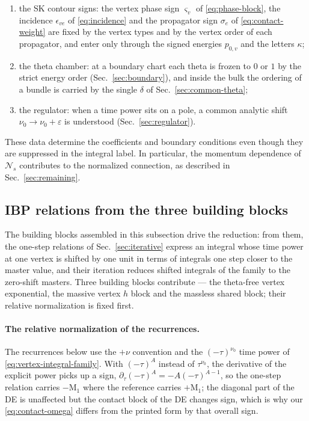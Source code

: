 \documentclass[11pt,a4paper]{article}
\numberwithin{table}{section}
\newcommand{\cN}{\mathcal N}
\begin{document}
\begin{enumerate}
        normalization of the sector seed, equal to $1$ for every example of
        Sec.~\ref{sec:examples-section};
  \item the SK contour signs: the vertex phase sign $\varsigma_v$ of \eqref{eq:phase-block}, the incidence
        $\epsilon_{ve}$ of \eqref{eq:incidence} and the propagator sign $\sigma_e$ of
        \eqref{eq:contact-weight} are fixed by the
        vertex types and by the vertex order of each propagator, and enter only through the signed
        energies $p_{0,v}$ and the letters $\kappa$;
  \item the theta chamber: at a boundary chart each theta is frozen to $0$ or $1$ by the strict
        energy order (Sec.~\ref{sec:boundary}), and inside the bulk the ordering of a bundle is
        carried by the single $\delta$ of Sec.~\ref{sec:common-theta};
  \item the regulator: when a time power sits on a pole, a common analytic shift
        $\nu_0\to\nu_0+\varepsilon$ is understood (Sec.~\ref{sec:regulator}).
\end{enumerate}
These data determine the coefficients and boundary conditions even though they are suppressed
in the integral label. In particular, the momentum dependence of $\cN_s$ contributes to the
normalized connection, as described in Sec.~\ref{sec:remaining}.

\subsection{IBP relations from the three building blocks}
\label{sec:ibp}
\label{sec:global}

The building blocks assembled in this subsection drive the reduction: from them, the one-step
relations of Sec.~\ref{sec:iterative} express an integral whose
time power at one vertex is shifted by one unit in terms of integrals one step closer to the
master value, and their iteration reduces shifted integrals of the family to the zero-shift
masters. Three building blocks contribute --- the theta-free vertex
exponential, the massive vertex $h$ block and the massless shared block; their relative
normalization is fixed first.

\paragraph{The relative normalization of the recurrences.}
The recurrences below use the $+\nu$ convention and the $(-\tau)^{\nu_0}$ time power
of \eqref{eq:vertex-integral-family}.
With $(-\tau)^{A}$ instead of $\tau^{\nu_0}$, the derivative of the explicit
power picks up a sign, $\partial_\tau(-\tau)^A=-A(-\tau)^{A-1}$, so the one-step relation carries
$-\text{M}_1$ where the reference carries $+\text{M}_1$; the diagonal part of the DE is unaffected
but the contact block of the DE changes sign, which is why our \eqref{eq:contact-omega} differs
from the printed \cite{Chen:2024glu} form by that overall sign.
\end{document}
